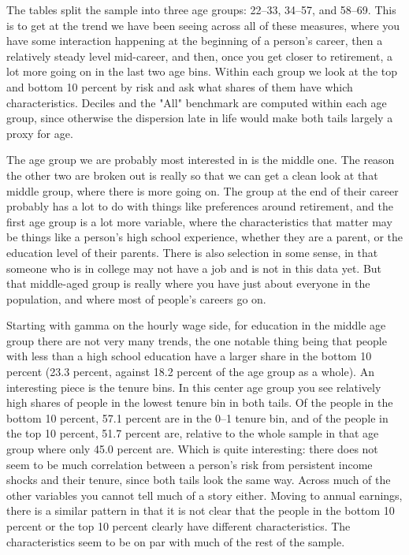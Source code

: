 \documentclass[12pt]{article}
\begin{document}
\begin{onehalfspace}
\begin{table}[H]
    \centering
    \caption{Mean Ensemble-Predicted Gamma in the Top and Bottom Predicted-Risk Deciles by Age, Annual Earnings (x 100)}
    \label{tab:gamma_deciles}
    \resizebox{\textwidth}{!}{%
        
    }
\end{table}

The tables split the sample into three age groups: 22--33, 34--57, and 58--69. This is to get at the trend we have been seeing across all of these measures, where you have some interaction happening at the beginning of a person's career, then a relatively steady level mid-career, and then, once you get closer to retirement, a lot more going on in the last two age bins. Within each group we look at the top and bottom 10 percent by risk and ask what shares of them have which characteristics. Deciles and the "All" benchmark are computed within each age group, since otherwise the dispersion late in life would make both tails largely a proxy for age.

The age group we are probably most interested in is the middle one. The reason the other two are broken out is really so that we can get a clean look at that middle group, where there is more going on. The group at the end of their career probably has a lot to do with things like preferences around retirement, and the first age group is a lot more variable, where the characteristics that matter may be things like a person's high school experience, whether they are a parent, or the education level of their parents. There is also selection in some sense, in that someone who is in college may not have a job and is not in this data yet. But that middle-aged group is really where you have just about everyone in the population, and where most of people's careers go on.

Starting with gamma on the hourly wage side, for education in the middle age group there are not very many trends, the one notable thing being that people with less than a high school education have a larger share in the bottom 10 percent (23.3 percent, against 18.2 percent of the age group as a whole). An interesting piece is the tenure bins. In this center age group you see relatively high shares of people in the lowest tenure bin in both tails. Of the people in the bottom 10 percent, 57.1 percent are in the 0--1 tenure bin, and of the people in the top 10 percent, 51.7 percent are, relative to the whole sample in that age group where only 45.0 percent are. Which is quite interesting: there does not seem to be much correlation between a person's risk from persistent income shocks and their tenure, since both tails look the same way. Across much of the other variables you cannot tell much of a story either. Moving to annual earnings, there is a similar pattern in that it is not clear that the people in the bottom 10 percent or the top 10 percent clearly have different characteristics. The characteristics seem to be on par with much of the rest of the sample.


\end{onehalfspace}
\end{document}
